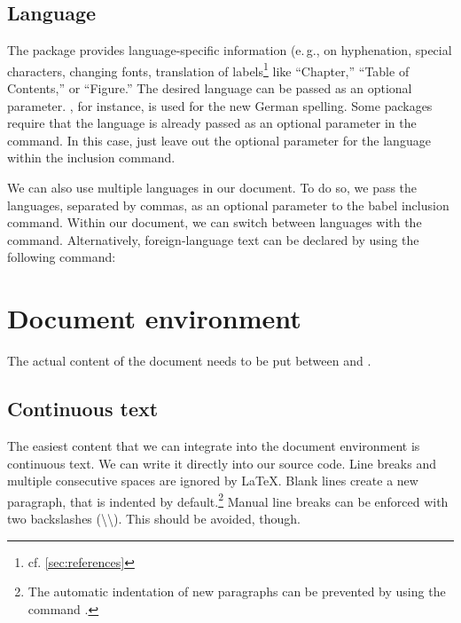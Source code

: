 \subsection{Language}\label{sec:language}
The package  provides language-specific information (e.\,g., on hyphenation, special characters, changing fonts, translation of labels\footnote{cf. \cref{sec:references}} like \enquote{Chapter,} \enquote{Table of Contents,} or \enquote{Figure.}
The desired language can be passed as an optional parameter. 
, for instance, is used for the new German spelling. 
Some packages require that the language is already passed as an optional parameter in the  command. 
In this case, just leave out the optional parameter for the language within the  inclusion command.

We can also use multiple languages in our document. 
To do so, we pass the languages, separated by commas, as an optional parameter to the babel inclusion command. 
Within our document, we can switch between languages with the  command. 
Alternatively, foreign-language text can be declared by using the following command: 


\section{Document environment}
The actual content of the  document needs to be put between  and .

\subsection{Continuous text}
The easiest content that we can integrate into the document environment is continuous text. 
We can write it directly into our source code. 
Line breaks and multiple consecutive spaces are ignored by \LaTeX{}. 
Blank lines create a new paragraph, that is indented by default.\footnote{The automatic indentation of new paragraphs can be prevented by using the command .}
Manual line breaks can be enforced with two backslashes (\textbackslash\textbackslash). 
This should be avoided, though. 

